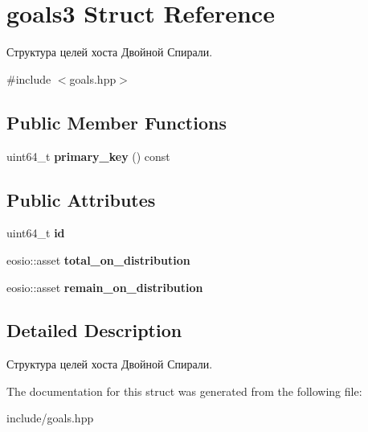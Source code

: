 \hypertarget{structgoals3}{}\section{goals3 Struct Reference}
\label{structgoals3}


Структура целей хоста Двойной Спирали.  




{\ttfamily \#include $<$goals.\+hpp$>$}

\subsection*{Public Member Functions}
\begin{DoxyCompactItemize}
\item 
\mbox{\label{structgoals3_a2d06e31d7cef3d14996bb5f49b04fd66}} 
uint64\+\_\+t {\bfseries primary\+\_\+key} () const
\end{DoxyCompactItemize}
\subsection*{Public Attributes}
\begin{DoxyCompactItemize}
\item 
\mbox{\label{structgoals3_a9eea3f010911379e6f4ead29d5a3fe71}} 
uint64\+\_\+t {\bfseries id}
\item 
\mbox{\label{structgoals3_a008e54ebad1f5d93e022501b3b3fc012}} 
eosio\+::asset {\bfseries total\+\_\+on\+\_\+distribution}
\item 
\mbox{\label{structgoals3_a8733ab368d84a3588b197e1b58a08c32}} 
eosio\+::asset {\bfseries remain\+\_\+on\+\_\+distribution}
\end{DoxyCompactItemize}


\subsection{Detailed Description}
Структура целей хоста Двойной Спирали. 

The documentation for this struct was generated from the following file\+:\begin{DoxyCompactItemize}
\item 
include/goals.\+hpp\end{DoxyCompactItemize}
